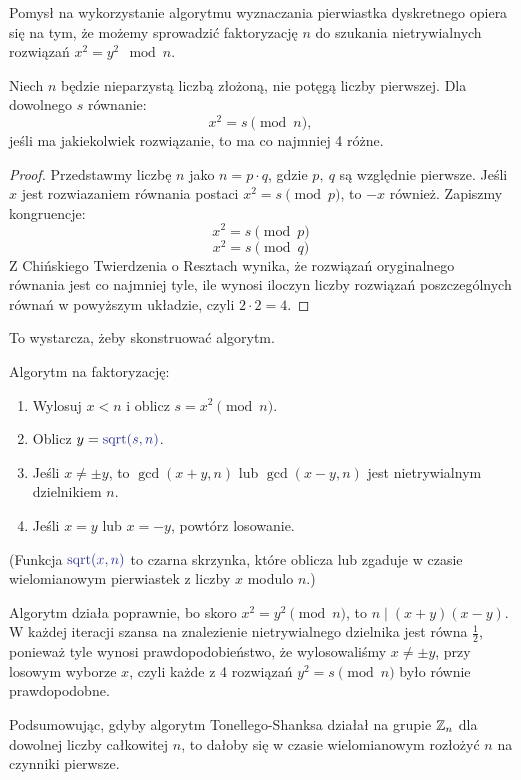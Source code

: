 Pomysł na wykorzystanie algorytmu wyznaczania pierwiastka dyskretnego opiera się na tym, że możemy sprowadzić faktoryzację \( n \) do szukania nietrywialnych rozwiązań \( x^2 = y^2 \mod n \).

\begin{lemma}
Niech \( n \) będzie nieparzystą liczbą złożoną, nie potęgą liczby pierwszej. Dla dowolnego \( s \) równanie:
\[
    x^2 = s \pmod{n},
\]
jeśli ma jakiekolwiek rozwiązanie, to ma co najmniej 4 różne.
\end{lemma}
\begin{proof}
    Przedstawmy liczbę \( n \) jako \( n = p \cdot q \), gdzie \( p, \ q \) są względnie pierwsze. Jeśli \( x \) jest rozwiazaniem równania postaci \( x^2 = s \pmod{p} \), to \( -x \) również. Zapiszmy kongruencje:
    \[
        x^2 = s \pmod{p}
    \]
    \[
        x^2 = s \pmod{q}
    \]
    Z Chińskiego Twierdzenia o Resztach wynika, że rozwiązań oryginalnego równania jest co najmniej tyle, ile wynosi iloczyn liczby rozwiązań poszczególnych równań w powyższym układzie, czyli \( 2 \cdot 2 = 4 \).
\end{proof}

To wystarcza, żeby skonstruować algorytm.
\begin{greyframe}
    Algorytm na faktoryzację:
    \begin{enumerate}
        \item Wylosuj \( x < n \) i oblicz \( s = x^2 \pmod{n} \).
        \item Oblicz \( y = \textcolor{Blue}{\text{sqrt}(s, n)} \).
        \item Jeśli \( x \neq \pm y \), to \( \gcd(x + y, n) \) lub \( \gcd(x - y, n) \) jest nietrywialnym dzielnikiem \( n \).
        \item Jeśli \( x = y \) lub \( x = -y \), powtórz losowanie.
    \end{enumerate}
\end{greyframe}
{\small (Funkcja \( \textcolor{Blue}{\text{sqrt}(x, n)} \) to czarna skrzynka, które oblicza lub zgaduje w czasie wielomianowym pierwiastek z liczby \( x \) modulo \( n \).)}

Algorytm działa poprawnie, bo skoro \( x^2 = y^2 \pmod{n} \), to \( n \mid (x + y)(x - y) \). W każdej iteracji szansa na znalezienie nietrywialnego dzielnika jest równa \( \frac{1}{2} \), ponieważ tyle wynosi prawdopodobieństwo, że wylosowaliśmy \( x \neq \pm y \), przy losowym wyborze \( x \), czyli każde z 4 rozwiązań \( y^2 = s \pmod{n} \) było równie prawdopodobne.

Podsumowując, gdyby algorytm Tonellego-Shanksa działał na grupie \( \mathbb{Z}_n \) dla dowolnej liczby całkowitej \( n \), to dałoby się w czasie wielomianowym rozłożyć \( n \) na czynniki pierwsze.